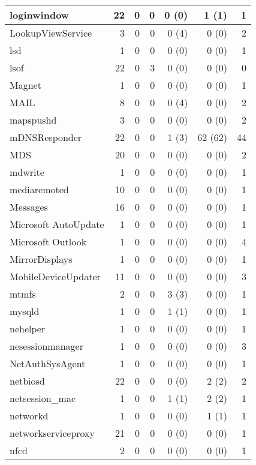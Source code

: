\begin{adjustwidth}{-2in}{}
\begin{scriptsize}
\begin{longtable}[l]{ l | r | r | r | r | r | r }
    loginwindow & 22 &  0 &  0 &  0 (0) &  1 (1) &  1 \\ \hline
    LookupViewService &  3 &  0 &  0 &  0 (4) &  0 (0) &  2 \\ \hline
    lsd &  1 &  0 &  0 &  0 (0) &  0 (0) &  1 \\ \hline
    lsof &  22 &  0 &  3 &  0 (0) &  0 (0) &  0 \\ \hline
    Magnet & 1 &  0 &  0 &  0 (0) &  0 (0) &  1 \\ \hline
    MAIL & 8 &  0 &  0 &  0 (4) &  0 (0) &  2 \\ \hline
    mapspushd &  3 &  0 &  0 &  0 (0) &  0 (0) &  2 \\ \hline
    mDNSResponder & 22 &  0 &  0 &  1 (3) &  62 (62) & 44 \\ \hline
    MDS & 20 &  0 &  0 &  0 (0) &  0 (0) &  2 \\ \hline
    mdwrite &  1 &  0 &  0 &  0 (0) &  0 (0) &  1 \\ \hline
    mediaremoted &  10 &  0 &  0 &  0 (0) &  0 (0) &  1 \\ \hline
    Messages &  16 &  0 &  0 &  0 (0) &  0 (0) &  1 \\ \hline
    Microsoft AutoUpdate &  1 &  0 &  0 &  0 (0) &  0 (0) &  1 \\ \hline
    Microsoft Outlook & 1 &  0 &  0 &  0 (0) &  0 (0) &  4 \\ \hline
    MirrorDisplays & 1 &  0 &  0 &  0 (0) &  0 (0) &  1 \\ \hline
    MobileDeviceUpdater & 11 &  0 &  0 &  0 (0) &  0 (0) &  3 \\ \hline
    mtmfs &  2 &  0 &  0 &  3 (3) &  0 (0) &  1 \\ \hline
    mysqld & 1 &  0 &  0 &  1 (1) &  0 (0) &  1 \\ \hline
    nehelper & 1 &  0 &  0 &  0 (0) &  0 (0) &  1 \\ \hline
    nesessionmanager & 1 &  0 &  0 &  0 (0) &  0 (0) &  3 \\ \hline
    NetAuthSysAgent &  1 &  0 &  0 &  0 (0) &  0 (0) &  1 \\ \hline
    netbiosd &  22 &  0 &  0 &  0 (0) &  2 (2) &  2 \\ \hline
    netsession\_mac & 1 &  0 &  0 &  1 (1) &  2 (2) &  1 \\ \hline
    networkd & 1 &  0 &  0 &  0 (0) &  1 (1) &  1 \\ \hline
    networkserviceproxy & 21 &  0 &  0 &  0 (0) &  0 (0) &  1 \\ \hline
    nfcd & 2 &  0 &  0 &  0 (0) &  0 (0) &  1 \\ \hline

\end{longtable}
\end{scriptsize}
\end{adjustwidth}
